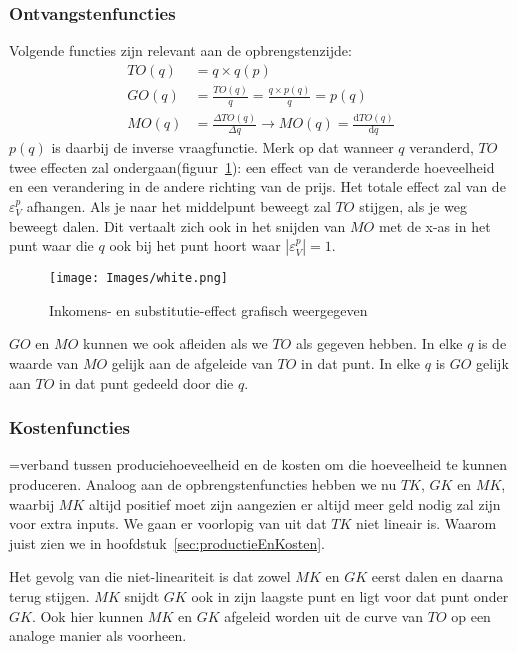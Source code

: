 \subsubsection{Ontvangstenfuncties}
Volgende functies zijn relevant aan de opbrengstenzijde:
\begin{subequations}
\begin{align}
	TO(q) &= q \times q(p)\\
    GO(q) &= \frac{TO(q)}{q} = \frac{q \times p(q)}{q} = p(q)\\
    MO(q) &= \frac{\Delta TO(q)}{\Delta q} \rightarrow MO(q) = \frac{\mathrm{d} TO(q)}{\mathrm{d}q}
\end{align}
\end{subequations}
$p(q)$ is daarbij de inverse vraagfunctie. Merk op dat wanneer $q$ veranderd, $TO$ twee effecten zal ondergaan(figuur~\ref{fig:GOenTO}): een effect van de veranderde hoeveelheid en een verandering in de andere richting van de prijs. Het totale effect zal van de $\varepsilon_{V}^p$ afhangen. Als je naar het middelpunt beweegt zal $TO$ stijgen, als je weg beweegt dalen. Dit vertaalt zich ook in het snijden van $MO$ met de x-as in het punt waar die $q$ ook bij het punt hoort waar $|\varepsilon_{V}^p| = 1$.

\begin{figure}[htbp]
	\centering
	\texttt{[image: Images/white.png]}
	\caption{Inkomens- en substitutie-effect grafisch weergegeven}
	\label{fig:GOenTO}
\end{figure}

$GO$ en $MO$ kunnen we ook afleiden als we $TO$ als gegeven hebben. In elke $q$ is de waarde van $MO$ gelijk aan de afgeleide van $TO$ in dat punt. In elke $q$ is $GO$ gelijk aan $TO$ in dat punt gedeeld door die $q$.


\subsubsection{Kostenfuncties}
=verband tussen produciehoeveelheid en de kosten om die hoeveelheid te kunnen produceren. Analoog aan de opbrengstenfuncties hebben we nu $TK$, $GK$ en $MK$, waarbij $MK$ altijd positief moet zijn aangezien er altijd meer geld nodig zal zijn voor extra inputs. We gaan er voorlopig van uit dat $TK$ niet lineair is. Waarom juist zien we in hoofdstuk~\ref{sec:productieEnKosten}.

Het gevolg van die niet-lineariteit is dat zowel $MK$ en $GK$ eerst dalen en daarna terug stijgen. $MK$ snijdt $GK$ ook in zijn laagste punt en ligt voor dat punt onder $GK$. Ook hier kunnen $MK$ en $GK$ afgeleid worden uit de curve van $TO$ op een analoge manier als voorheen.


